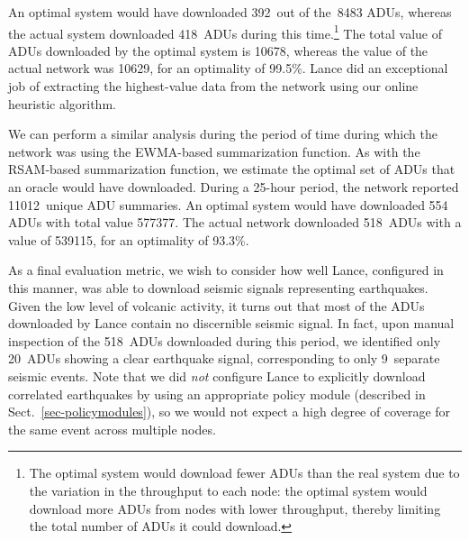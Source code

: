 An optimal system would have downloaded 392~out of the~8483 ADUs,
whereas the actual system downloaded 418~ADUs during this 
time.\footnote{The optimal system would download fewer ADUs 
than the real system due to the variation in the throughput to each 
node: the optimal system would download more ADUs from nodes 
with lower throughput, thereby limiting the total number of ADUs it could
download.} The total value of ADUs downloaded by the optimal system 
is 10678, whereas the value of the actual network was 10629, for an
optimality of 99.5\%. Lance did an exceptional job of extracting the
highest-value data from the network using our online heuristic
algorithm.

We can perform a similar analysis during the period of time during which the
network was using the EWMA-based summarization function. As with the
RSAM-based summarization function, we estimate the optimal set of ADUs that an
oracle would have downloaded. During a 25-hour period, the network reported
11012~unique ADU summaries. An optimal system would have downloaded 554 ADUs
with total value 577377.  The actual network downloaded 518~ADUs with a value
of 539115, for an optimality of 93.3\%. 

As a final evaluation metric, we wish to consider how well Lance, configured
in this manner, was able to download seismic signals representing earthquakes.
Given the low level of volcanic activity, it turns out that most of the ADUs
downloaded by Lance contain no discernible seismic signal. In fact, upon
manual inspection of the 518~ADUs downloaded during this period, we identified
only 20~ADUs showing a clear earthquake signal, corresponding to only
9~separate seismic events.  Note that we did {\em not} configure Lance to
explicitly download correlated earthquakes by using an appropriate policy
module (described in Sect.~\ref{sec-policymodules}), so we would not expect
a high degree of coverage for the same event across multiple nodes.

